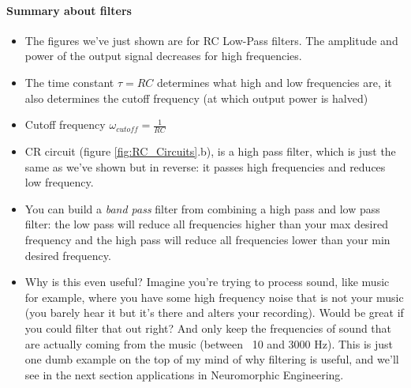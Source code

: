 \paragraph{Summary about filters}
\begin{itemize}
    \item The figures we've just shown are for RC Low-Pass filters. The amplitude and power of the output signal decreases for high frequencies. 
    \item The time constant $\tau = RC$ determines what high and low frequencies are, it also determines the cutoff frequency (at which output power is halved)
    \item Cutoff frequency $\omega_{cutoff} = \frac{1}{RC}$
    \item CR circuit (figure \ref{fig:RC_Circuits}.b), is a high pass filter, which is just the same as we've shown but in reverse: it passes high frequencies and reduces low frequency. 
    \item You can build a \textit{band pass} filter from combining a high pass and low pass filter: the low pass will reduce all frequencies higher than your max desired frequency and the high pass will reduce all frequencies lower than your min desired frequency. 
    \item Why is this even useful? Imagine you're trying to process sound, like music for example, where you have some high frequency noise that is not your music (you barely hear it but it's there and alters your recording). Would be great if you could filter that out right? And only keep the frequencies of sound that are actually coming from the music (between ~10 and 3000 Hz). This is just one dumb example on the top of my mind of why filtering is useful, and we'll see in the next section applications in Neuromorphic Engineering. 
\end{itemize}



